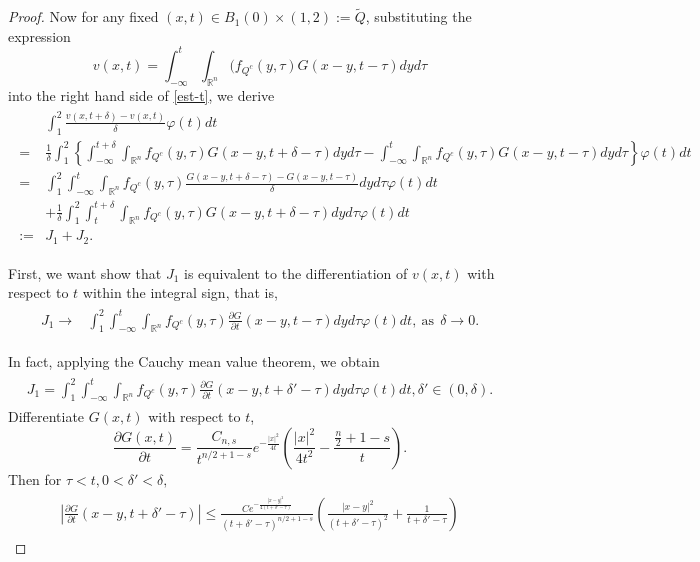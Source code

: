 \documentclass[12pt]{article}
\theoremstyle{remark}
\numberwithin{equation}{section}
\newcommand{\R}{\mathbb{R}}
\newcommand{\mb}{\mbox}
\begin{document}
\begin{proof}
Now for any fixed $(x,t)\in B_1(0)\times(1,2):=\tilde{Q}$, substituting the expression
\begin{equation}v(x,t)=\int_{-\infty}^t \int_{\mathbb{R}^n} (f_{Q^c}(y,\tau) G(x-y, t-\tau) dy d\tau\end{equation}
into the right hand side  of \eqref{est-t}, we derive
\begin{eqnarray}\label{est-t1}
\begin{aligned}
&\int_1^2\frac{v(x,t+\delta)-v(x,t)}{\delta}\varphi(t)dt\\
=&\frac{1}{\delta}\int_1^2\left\{\int_{-\infty}^{t+\delta}\int_{\R^n}f_{Q^c}(y,\tau)G(x-y,t+\delta-\tau)dyd\tau
-\int_{-\infty}^{t}\int_{\R^n}f_{Q^c}(y,\tau)G(x-y,t-\tau)dyd\tau\right\}\varphi(t)dt\\
=&\int_1^2\int_{-\infty}^{t}\int_{\R^n}f_{Q^c}(y,\tau)\frac{G(x-y,t+\delta-\tau)-G(x-y,t-\tau)}{\delta}dyd\tau\varphi(t)dt\\
&+\frac{1}{\delta}\int_1^2\int_{t}^{t+\delta}\int_{\R^n}f_{Q^c}(y,\tau)G(x-y,t+\delta-\tau)dyd\tau\varphi(t)dt\\
:=&J_1+J_2.\end{aligned}
\end{eqnarray}

First, we want show that $J_1$  is equivalent to the differentiation of $v(x,t)$ with respect to $t$ within the integral sign, that is,
\begin{eqnarray}\label{J1-lim}
\begin{aligned}
J_1\to&\int_1^2\int_{-\infty}^{t}\int_{\R^n}f_{Q^c}(y,\tau)\frac{\partial G}{\partial t} (x-y,t-\tau)dyd\tau\varphi(t)dt, \ \mb{as}\ \ \delta\to 0.
\end{aligned}
\end{eqnarray}

 In fact, applying the Cauchy mean value theorem, we obtain
\begin{eqnarray*}
\begin{aligned}J_1=\int_1^2\int_{-\infty}^{t}\int_{\R^n}f_{Q^c}(y,\tau)\frac{\partial G}{\partial t}(x-y,t+\delta'-\tau)dyd\tau\varphi(t)dt, \delta'\in(0,\delta).\end{aligned}
\end{eqnarray*}
Differentiate $G(x,t)$ with respect to $t$,
\begin{equation}\label{grn-t}\frac{\partial G(x,t)}{\partial t}%
=\frac{C_{n,s}}{{t}^{n/2+1-s}} e^{-\frac{|x|^2}{4t}}(\frac{|x|^2}{4t^2}-\frac{\frac{n}{2}+1-s}{t}).\end{equation}
Then for $\tau<t, 0<\delta'<\delta,$
\begin{eqnarray}\label{delt}
\begin{aligned}\left|\frac{\partial G}{\partial t}(x-y,t+\delta'-\tau)\right|\leq \frac{C e^{-\frac{|x-y|^2}{4(t+\delta'-\tau)}}}{{(t+\delta'-\tau)}^{n/2+1-s}}\left(\frac{|x-y|^2}{(t+\delta'-\tau)^2}+\frac{1}{t+\delta'-\tau}\right)\end{aligned}
\end{eqnarray}


\end{proof}
\end{document}
